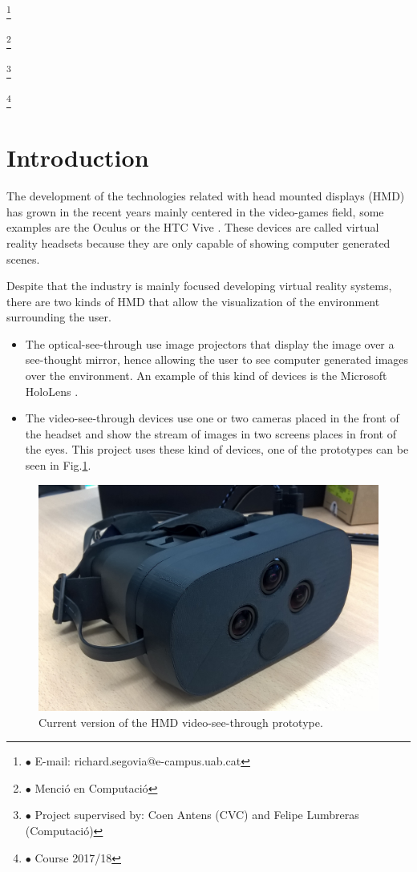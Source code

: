 \documentclass[10pt,a4paper,twocolumn,twoside]{article}
\newcommand\blfootnote[1]{%
  \begingroup
  \renewcommand\thefootnote{}\footnote{#1}%
  \addtocounter{footnote}{-1}%
  \endgroup
}
\begin{document}
	\blfootnote{$\bullet$ E-mail: richard.segovia@e-campus.uab.cat}
	\blfootnote{$\bullet$ Menció en Computació}
	\blfootnote{$\bullet$ Project supervised by: Coen Antens (CVC) and Felipe Lumbreras (Computació)}
	\blfootnote{$\bullet$ Course 2017/18}
	
	\section{Introduction}
	
	The development of the technologies related with head mounted displays (HMD) has grown in the recent years mainly centered in the video-games field, some examples are the Oculus \cite{web:oculus} or the HTC Vive \cite{web:vive}. These devices are called virtual reality headsets because they are only capable of showing computer generated scenes.  
	
	Despite that the industry is mainly focused developing virtual reality systems, there are two kinds of HMD that allow the visualization of the environment surrounding the user.  

	\begin{itemize}
	\item The optical-see-through use image projectors that display the image over a see-thought mirror, hence allowing the user to see computer generated images over the environment. An example of this kind of devices is the Microsoft HoloLens \cite{web:hololens}.
	\item The video-see-through devices use one or two cameras placed in the front of the headset and show the stream of images in two screens places in front of the eyes. This project uses these kind of devices, one of the prototypes can be seen in Fig.\ref{fig:proto}. 
	\end{itemize}

	\begin{figure}
		\centering
		\includegraphics[width=1\linewidth]{img/imagenproto3.jpg}
		\caption{Current version of the HMD video-see-through prototype.}
		\label{fig:proto}
	\end{figure}
	
\end{document}
